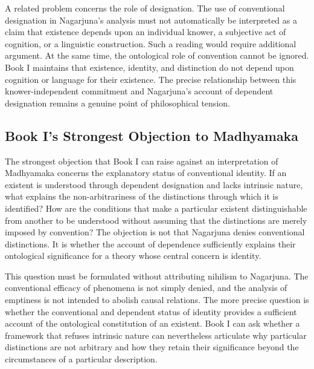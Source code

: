 \label{para:VS.B01.P01.C08.S18.SS16.P002}
A related problem concerns the role of designation. The use of conventional designation in Nagarjuna's analysis must not automatically be interpreted as a claim that existence depends upon an individual knower, a subjective act of cognition, or a linguistic construction. Such a reading would require additional argument. At the same time, the ontological role of convention cannot be ignored. Book I maintains that existence, identity, and distinction do not depend upon cognition or language for their existence. The precise relationship between this knower-independent commitment and Nagarjuna's account of dependent designation remains a genuine point of philosophical tension.

\subsection{Book I's Strongest Objection to Madhyamaka}
\label{subsec:ch08_s18_ss17}

\label{para:VS.B01.P01.C08.S18.SS17.P001}
The strongest objection that Book I can raise against an interpretation of Madhyamaka concerns the explanatory status of conventional identity. If an existent is understood through dependent designation and lacks intrinsic nature, what explains the non-arbitrariness of the distinctions through which it is identified? How are the conditions that make a particular existent distinguishable from another to be understood without assuming that the distinctions are merely imposed by convention? The objection is not that Nagarjuna denies conventional distinctions. It is whether the account of dependence sufficiently explains their ontological significance for a theory whose central concern is identity.

\label{para:VS.B01.P01.C08.S18.SS17.P002}
This question must be formulated without attributing nihilism to Nagarjuna. The conventional efficacy of phenomena is not simply denied, and the analysis of emptiness is not intended to abolish causal relations. The more precise question is whether the conventional and dependent status of identity provides a sufficient account of the ontological constitution of an existent. Book I can ask whether a framework that refuses intrinsic nature can nevertheless articulate why particular distinctions are not arbitrary and how they retain their significance beyond the circumstances of a particular description.

